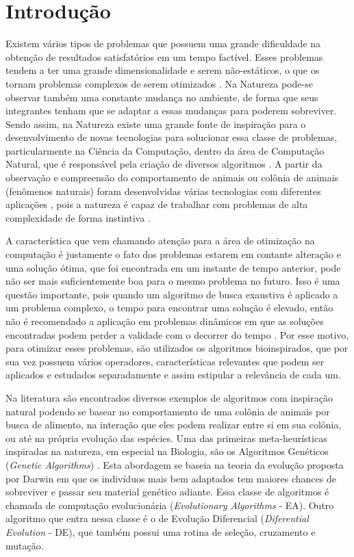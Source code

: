 \chapter{Introdução}
\label{ch:intro}

Existem vários tipos de problemas que possuem uma grande dificuldade na obtenção de resultados satisfatórios em um tempo factível. Esses problemas tendem a ter uma grande dimensionalidade e serem não-estáticos, o que os tornam problemas complexos de serem otimizados \cite{de2004otimizaccao}. Na Natureza pode-se observar também uma constante mudança no ambiente, de forma que seus integrantes tenham que se adaptar a essas mudanças para poderem sobreviver. Sendo assim, na Natureza existe uma grande fonte de inspiração para o desenvolvimento de novas tecnologias para solucionar essa classe de problemas, particularmente na Ciência da Computação, dentro da área de Computação Natural, que é responsável pela criação de diversos algoritmos \cite{de2007fundamentals}. A partir da observação e compreensão do comportamento de animais ou colônia de animais (fenômenos naturais) foram desenvolvidas várias tecnologias com diferentes aplicações \cite{rozenberg2011handbook}, pois a natureza é capaz de trabalhar com problemas de alta complexidade de forma instintiva \cite{andre2015multiple}.

A característica que vem chamando atenção para a área de otimização na computação é justamente o fato dos problemas estarem em contante alteração e uma solução ótima, que foi encontrada em um instante de tempo anterior, pode não ser mais suficientemente boa para o mesmo problema no futuro. Isso é uma questão importante, pois quando um algoritmo de busca exaustiva é aplicado a um problema complexo, o tempo para encontrar uma solução é elevado, então não é recomendado a aplicação em problemas dinâmicos em que as soluções encontradas podem perder a validade com o decorrer do tempo \cite{morrison2003performance}. Por esse motivo, para otimizar esses problemas, são utilizados os algoritmos bioinspirados, que por sua vez possuem vários operadores, características relevantes que podem ser aplicados e estudados separadamente e assim estipular a relevância de cada um.

Na literatura são encontrados diversos exemplos de algoritmos com inspiração natural podendo se basear no comportamento de uma colônia de animais por busca de alimento, na interação que eles podem realizar entre si em sua colônia, ou até na própria evolução das espécies. Uma das primeiras meta-heurísticas inspiradas na natureza, em especial na Biologia, são os Algoritmos Genéticos (\textit{Genetic Algorithms}) \cite{holland1975adaptation}. Esta abordagem se baseia na teoria da evolução proposta por Darwin em que os indivíduos mais bem adaptados tem maiores chances de sobreviver e passar seu material genético adiante. Essa classe de algoritmos é chamada de computação evolucionária (\textit{Evolutionary Algorithms} - EA). Outro algoritmo que entra nessa classe é o de Evolução Diferencial (\textit{Diferential Evolution} - DE), que também possui uma rotina de seleção, cruzamento e mutação. 


